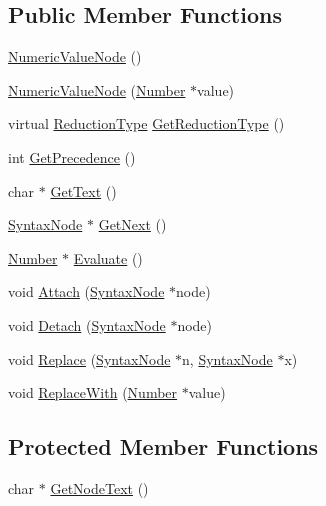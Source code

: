 \subsection*{Public Member Functions}
\begin{DoxyCompactItemize}
\item 
\hyperlink{classNumericValueNode_a85977b96aa8e3883e409ca549139258b}{Numeric\+Value\+Node} ()
\item 
\hyperlink{classNumericValueNode_a5ad87623d57e875b72d8f166c578231f}{Numeric\+Value\+Node} (\hyperlink{structNumber}{Number} $\ast$value)
\item 
virtual \hyperlink{nodes_8h_ab321a69ad5704b704b8dd9e1b3984a29}{Reduction\+Type} \hyperlink{classNumericValueNode_ad75510c6a6e06f4004248d072cd5c3cb}{Get\+Reduction\+Type} ()
\item 
int \hyperlink{classNumericValueNode_a711b5772df36814fcb92fc10a0e4924a}{Get\+Precedence} ()
\item 
char $\ast$ \hyperlink{classNumericValueNode_a57b1e79016279279f2567937c7e32e12}{Get\+Text} ()
\item 
\hyperlink{classSyntaxNode}{Syntax\+Node} $\ast$ \hyperlink{classNumericValueNode_aaed4656d8f0dfc697b75a47b4852baa4}{Get\+Next} ()
\item 
\hyperlink{structNumber}{Number} $\ast$ \hyperlink{classNumericValueNode_abdd2e6fd1723488a24a645fec481a971}{Evaluate} ()
\item 
void \hyperlink{classNumericValueNode_a566d4509edd41f495d4508bd1bd14949}{Attach} (\hyperlink{classSyntaxNode}{Syntax\+Node} $\ast$node)
\item 
void \hyperlink{classNumericValueNode_ac2a2b87d3cff4f113c57df82e64b76cd}{Detach} (\hyperlink{classSyntaxNode}{Syntax\+Node} $\ast$node)
\item 
void \hyperlink{classNumericValueNode_a5df4820b27e2e69367cb88d973717f1c}{Replace} (\hyperlink{classSyntaxNode}{Syntax\+Node} $\ast$n, \hyperlink{classSyntaxNode}{Syntax\+Node} $\ast$x)
\item 
void \hyperlink{classNumericValueNode_ab46507560d70b5e4396f1f5fba5368ec}{Replace\+With} (\hyperlink{structNumber}{Number} $\ast$value)
\end{DoxyCompactItemize}
\subsection*{Protected Member Functions}
\begin{DoxyCompactItemize}
\item 
char $\ast$ \hyperlink{classNumericValueNode_a078bf8f0496d2afcb7e3a050110a0c0d}{Get\+Node\+Text} ()
\end{DoxyCompactItemize}
